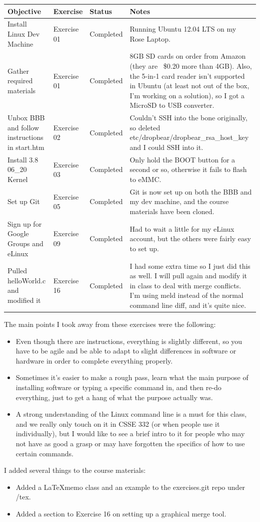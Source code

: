 \documentclass[letterpaper,10pt]{texMemo}
\begin{document}
\begin{center}
\begin{tabular}{|p{4cm}|l|l|p{8cm}|}
\hline
\textbf{Objective} & \textbf{Exercise} &\textbf{Status} & \textbf{Notes}\\
\hline
Install Linux Dev Machine & Exercise 01 & Completed & Running Ubuntu 12.04 LTS on my Rose Laptop.\\
\hline
Gather required materials & Exercise 01 & Completed & 8GB SD cards on order from Amazon (they are ~\$0.20 more than 4GB). Also, the 5-in-1 card reader isn't supported in Ubuntu (at least not out of the box, I'm working on a solution), so I got a MicroSD to USB converter.\\
\hline
Unbox BBB and follow instructions in start.htm & Exercise 02 & Completed & Couldn't SSH into the bone originally, so deleted etc/dropbear/dropbear\_rsa\_host\_key and I could SSH into it.\\
\hline
Install 3.8 06\_20 Kernel & Exercise 03 & Completed & Only hold the BOOT button for a second or so, otherwise it fails to flash to eMMC.\\
\hline
Set up Git & Exercise 05 & Completed & Git is now set up on both the BBB and my dev machine, and the course materials have been cloned.\\
\hline
Sign up for Google Groups and eLinux & Exercise 09 & Completed & Had to wait a little for my eLinux account, but the others were fairly easy to set up.\\
\hline
Pulled helloWorld.c and modified it & Exercise 16 & Completed & I had some extra time so I just did this as well. I will pull again and modify it in class to deal with merge conflicts. I'm using meld instead of the normal command line diff, and it's quite nice.\\ 
\hline
\end{tabular}
\end{center}

\noindent The main points I took away from these exercises were the following:
\begin{itemize}
 \item Even though there are instructions, everything is slightly different, so you have to be agile and be able to adapt to slight differences in software or hardware in order to complete everything properly.
 \item Sometimes it's easier to make a rough pass, learn what the main purpose of installing software or typing a specific command in, and then re-do everything, just to get a hang of what the purpose actually was.
 \item A strong understanding of the Linux command line is a must for this class, and we really only touch on it in CSSE 332 (or when people use it individually), but I would like to see a brief intro to it for people who may not have as good a grasp or may have forgotten the specifics of how to use certain commands.
\end{itemize}

\noindent I added several things to the course materials:
\begin{itemize}
 \item Added a \LaTeX memo class and an example to the exercises.git repo under /tex.
 \item Added a section to Exercise 16 on setting up a graphical merge tool.
\end{itemize}
\end{document}
